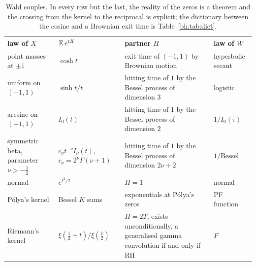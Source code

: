 \begin{table}[t]
\centering
\footnotesize
\begin{tabular}{p{}p{}p{}p{}}
\toprule
law of $X$ & $\mathbb{E}\,e^{tX}$ & partner $H$ & law of $W$\\
\midrule
point masses at $\pm1$ & $\cosh t$ & exit time of $(-1,1)$ by Brownian motion & hyperbolic secant\\
uniform on $(-1,1)$ & $\sinh t/t$ & hitting time of $1$ by the Bessel process of dimension $3$ & logistic\\
arcsine on $(-1,1)$ & $I_0(t)$ & hitting time of $1$ by the Bessel process of dimension $2$ & $1/I_0(\tau)$\\
symmetric beta, parameter $\nu>-\frac12$ & $c_\nu t^{-\nu}I_\nu(t)$, $c_\nu=2^\nu\Gamma(\nu+1)$ & hitting time of $1$ by the Bessel process of dimension $2\nu+2$ & $1/$Bessel\\
normal & $e^{t^2/2}$ & $H=1$ & normal\\
P\'olya's kernel & Bessel $K$ sums & exponentials at P\'olya's zeros & PF function\\
Riemann's kernel & $\xi(\frac12+t)/\xi(\frac12)$ & $H=2T$, exists unconditionally, a generalised gamma convolution if and only if RH & $F$\\
\bottomrule
\end{tabular}
\caption{Wald couples. In every row but the last, the reality of the zeros is a theorem and the crossing from the kernel to the reciprocal is explicit; the dictionary between the cosine and a Brownian exit time is Table~\ref{bh:tab:dict}.}
\label{c:tab:wald}
\end{table}

